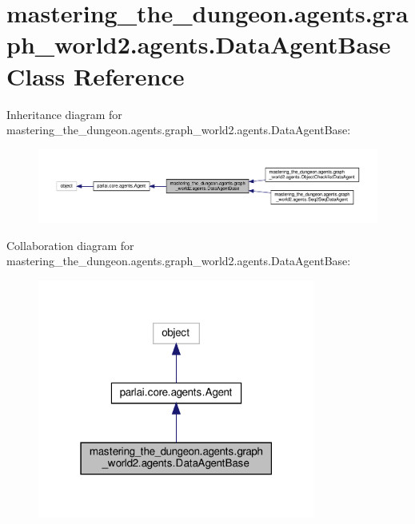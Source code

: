 \hypertarget{classmastering__the__dungeon_1_1agents_1_1graph__world2_1_1agents_1_1DataAgentBase}{}\section{mastering\+\_\+the\+\_\+dungeon.\+agents.\+graph\+\_\+world2.\+agents.\+Data\+Agent\+Base Class Reference}
\label{classmastering__the__dungeon_1_1agents_1_1graph__world2_1_1agents_1_1DataAgentBase}


Inheritance diagram for mastering\+\_\+the\+\_\+dungeon.\+agents.\+graph\+\_\+world2.\+agents.\+Data\+Agent\+Base\+:
\nopagebreak
\begin{figure}[H]
\begin{center}
\leavevmode
\includegraphics[width=350pt]{classmastering__the__dungeon_1_1agents_1_1graph__world2_1_1agents_1_1DataAgentBase__inherit__graph}
\end{center}
\end{figure}


Collaboration diagram for mastering\+\_\+the\+\_\+dungeon.\+agents.\+graph\+\_\+world2.\+agents.\+Data\+Agent\+Base\+:
\nopagebreak
\begin{figure}[H]
\begin{center}
\leavevmode
\includegraphics[width=259pt]{classmastering__the__dungeon_1_1agents_1_1graph__world2_1_1agents_1_1DataAgentBase__coll__graph}
\end{center}
\end{figure}
